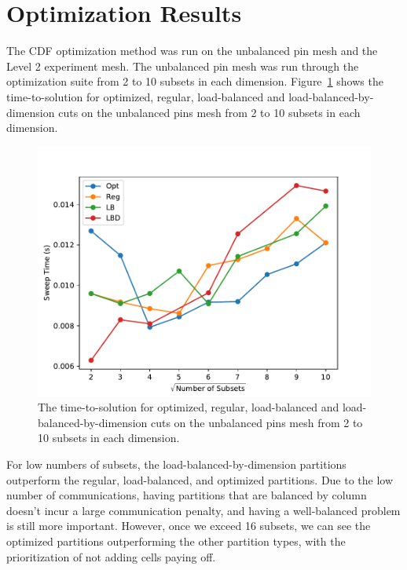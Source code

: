 \section{Optimization Results}
The CDF optimization method was run on the unbalanced pin mesh and the Level 2 experiment mesh.
The unbalanced pin mesh was run through the optimization suite from 2 to 10 subsets in each dimension.
Figure~\ref{ubp_opt} shows the time-to-solution for optimized, regular, load-balanced and load-balanced-by-dimension cuts on the unbalanced pins mesh from 2 to 10 subsets in each dimension.
\begin{figure}[ht]
\centering
  \includegraphics{../../figures/unbalanced_pins_opt_comparison.pdf}
  \caption{The time-to-solution for optimized, regular, load-balanced and load-balanced-by-dimension cuts on the unbalanced pins mesh from 2 to 10 subsets in each dimension.}
  \label{ubp_opt}
\end{figure}
For low numbers of subsets, the load-balanced-by-dimension partitions outperform the regular, load-balanced, and optimized partitions.
Due to the low number of communications, having partitions that are balanced by column doesn't incur a large communication penalty, and having a well-balanced problem is still more important.
However, once we exceed 16 subsets, we can see the optimized partitions outperforming the other partition types, with the prioritization of not adding cells paying off.

